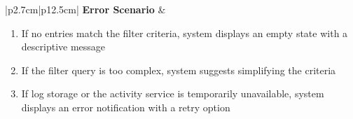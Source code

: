 \begin{table}[H]
\begin{tabular}{|p{2.7cm}|p{12.5cm}|}
        \hline
        \textbf{Error Scenario} & \begin{minipage}[t]{\linewidth}
            \begin{enumerate}[topsep=0pt,itemsep=1pt,parsep=0pt,partopsep=0pt]
                \item If no entries match the filter criteria, system displays an empty state with a descriptive message
                \item If the filter query is too complex, system suggests simplifying the criteria
                \item If log storage or the activity service is temporarily unavailable, system displays an error notification with a retry option
            \end{enumerate}
        \end{minipage} \\
        \hline
    \end{tabular}
    \label{tab:admin-activity-logs}
\end{table}


